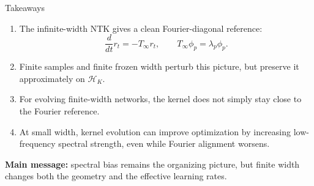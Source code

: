 \documentclass[10pt,aspectratio=169]{beamer}
\begin{document}
\begin{frame}{Takeaways}

	\begin{enumerate}
		\item The infinite-width NTK gives a clean Fourier-diagonal reference:
		      \[
			      \frac{d}{dt}r_t=-T_\infty r_t,
			      \qquad
			      T_\infty \phi_p=\lambda_p\phi_p.
		      \]

		\item Finite samples and finite frozen width perturb this picture, but preserve it approximately on \(\mathcal H_K\).

		\item For evolving finite-width networks, the kernel does not simply stay close to the Fourier reference.

		\item At small width, kernel evolution can improve optimization by increasing low-frequency spectral strength, even while Fourier alignment worsens.
	\end{enumerate}

	\vspace{0.25cm}

	\textbf{Main message:}
	spectral bias remains the organizing picture, but finite width changes both the geometry and the effective learning rates.

\end{frame}
\end{document}
